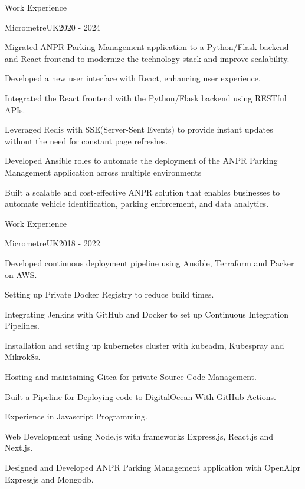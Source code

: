 \documentclass{resume}
\begin{document}
\begin{rSection}{Work Experience}
\begin{rSubsection}{MicrometreUK}{2020 - 2024}{}


\item Migrated ANPR Parking Management application to a Python/Flask backend and React frontend to modernize the technology stack and improve scalability.
\item Developed a new user interface with React, enhancing user experience. 
\item Integrated the React frontend with the Python/Flask backend using RESTful APIs.
\item Leveraged Redis  with SSE(Server-Sent Events) to provide instant updates without  the need for constant page refreshes.
\item Developed Ansible roles to automate the deployment of the ANPR Parking Management application across multiple environments
\item Built a scalable and cost-effective ANPR solution that enables businesses to automate  vehicle identification, parking enforcement, and data analytics.




\end{rSubsection}
\end{rSection}


\begin{rSection}{Work Experience}
\begin{rSubsection}{MicrometreUK}{2018 - 2022}{}

\item Developed continuous deployment pipeline using Ansible, Terraform and Packer on AWS. 
\item Setting up Private Docker Registry  to reduce build times.  
\item Integrating Jenkins with GitHub and Docker to set up Continuous Integration Pipelines.
\item Installation and setting up kubernetes cluster with kubeadm, Kubespray and Mikrok8s. 
\item Hosting and maintaining Gitea for private Source Code Management.
\item Built a Pipeline for  Deploying code to DigitalOcean With GitHub Actions.
\item Experience in Javascript Programming.
\item Web Development using Node.js with frameworks Express.js, React.js and Next.js.
\item Designed and Developed ANPR Parking Management application with OpenAlpr Expressjs and Mongodb.
\end{rSubsection}
\end{rSection}
\end{document}
